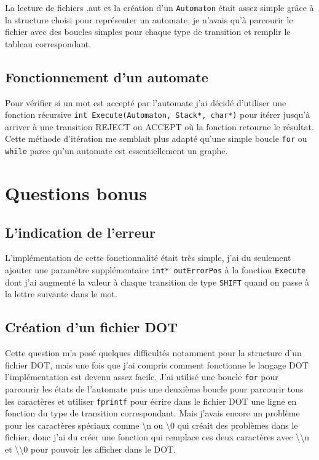 \documentclass{article}
\begin{document}
La lecture de fichiers .aut et la création d'un \lstinline{Automaton} était assez simple grâce à la structure choisi pour représenter un automate, je n'avais qu'à parcourir le fichier avec des boucles simples pour chaque type de transition et remplir le tableau correspondant.

\subsection{Fonctionnement d'un automate}

Pour vérifier si un mot est accepté par l'automate j'ai décidé d'utiliser une fonction récursive
\lstinline{int Execute(Automaton, Stack*, char*)} pour itérer jusqu'à arriver à une transition REJECT ou ACCEPT où la fonction retourne le résultat. Cette méthode d'itération me semblait plus adapté qu'une simple boucle \lstinline{for} ou \lstinline{while} parce qu'un automate est essentiellement un graphe.

\section{Questions bonus}
\subsection{L'indication de l'erreur}
L'implémentation de cette fonctionnalité était très simple, j'ai du seulement ajouter une paramètre  supplémentaire \lstinline{int* outErrorPos} à la fonction \lstinline{Execute} dont j'ai augmenté la valeur à chaque transition de type \lstinline{SHIFT} quand on passe à la lettre suivante dans le mot.

\subsection{Création d'un fichier DOT}
Cette question m'a posé quelques difficultés notamment pour la structure d'un fichier DOT, mais une fois que j'ai compris comment fonctionne le langage DOT l'implémentation est devenu assez facile. J'ai utilisé une boucle \lstinline{for} pour parcourir les états de l'automate puis une deuxième boucle pour parcourir tous les caractères et utiliser \lstinline{fprintf} pour écrire dans le fichier DOT une ligne en fonction du type de transition correspondant. Mais j'avais encore un problème pour les caractères spéciaux comme \textbackslash n ou \textbackslash 0 qui créait des problèmes dans le fichier, donc j'ai du créer une fonction qui remplace ces deux caractères avec \textbackslash \textbackslash n et \textbackslash \textbackslash 0 pour pouvoir les afficher dans le DOT.
\end{document}
